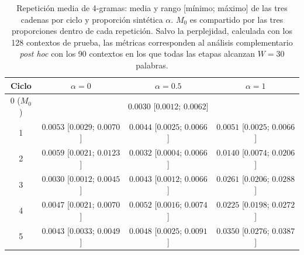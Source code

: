 
\begin{table}[ht]
\centering
\footnotesize
\begin{tabular}{c c c c}
\hline
Ciclo & $\alpha=0$ & $\alpha=0.5$ & $\alpha=1$ \\
\hline
0 ($M_0$) & \multicolumn{3}{c}{$0.0030$ [$0.0012$; $0.0062$]} \\
1 & $0.0053$ [$0.0029$; $0.0070$] & $0.0044$ [$0.0025$; $0.0066$] & $0.0051$ [$0.0025$; $0.0066$] \\
2 & $0.0059$ [$0.0021$; $0.0123$] & $0.0032$ [$0.0004$; $0.0066$] & $0.0140$ [$0.0074$; $0.0206$] \\
3 & $0.0030$ [$0.0012$; $0.0045$] & $0.0043$ [$0.0012$; $0.0066$] & $0.0261$ [$0.0206$; $0.0288$] \\
4 & $0.0047$ [$0.0021$; $0.0070$] & $0.0052$ [$0.0016$; $0.0074$] & $0.0225$ [$0.0198$; $0.0272$] \\
5 & $0.0043$ [$0.0033$; $0.0049$] & $0.0048$ [$0.0025$; $0.0091$] & $0.0350$ [$0.0276$; $0.0387$] \\
\hline
\end{tabular}
\caption{Repetición media de 4-gramas: media y rango [mínimo; máximo] de las tres cadenas por ciclo y proporción sintética $\alpha$. $M_0$ es compartido por las tres proporciones dentro de cada repetición. Salvo la perplejidad, calculada con los 128 contextos de prueba, las métricas corresponden al análisis complementario \textit{post hoc} con los 90 contextos en los que todas las etapas alcanzan $W=30$ palabras.}
\label{tab:medias_repeat_4_mean}
\end{table}

